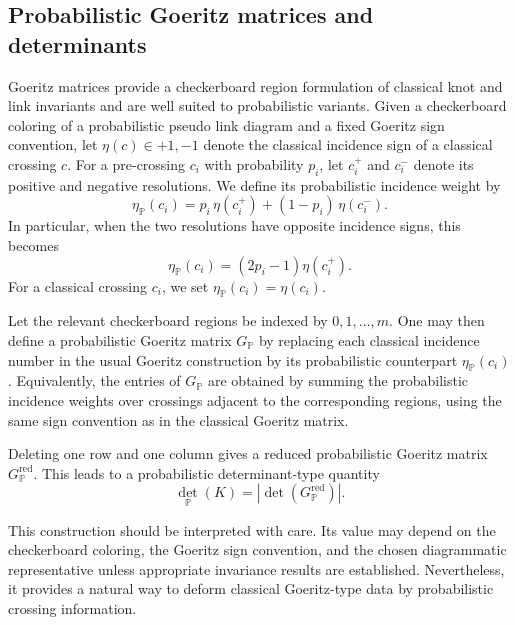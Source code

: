 \documentclass[a4paper, reqno, 12pt]{amsart}
\theoremstyle{plain}
\theoremstyle{definition}
\begin{document}
\subsection{Probabilistic Goeritz matrices and determinants}

Goeritz matrices provide a checkerboard region formulation of classical knot and link invariants and are well suited to probabilistic variants. Given a checkerboard coloring of a probabilistic pseudo link diagram and a fixed Goeritz sign convention, let \(\eta(c)\in{+1,-1}\) denote the classical incidence sign of a classical crossing \(c\). For a pre-crossing \(c_i\) with probability \(p_i\), let \(c_i^+\) and \(c_i^-\) denote its positive and negative resolutions. We define its probabilistic incidence weight by
\[
\eta_{\mathbb P}(c_i)
=
p_i\,\eta(c_i^+)+(1-p_i)\,\eta(c_i^-).
\]
In particular, when the two resolutions have opposite incidence signs, this becomes
\[
\eta_{\mathbb P}(c_i)
=
(2p_i-1)\eta(c_i^+).
\]
For a classical crossing \(c_i\), we set
\(\eta_{\mathbb P}(c_i)=\eta(c_i)\).

Let the relevant checkerboard regions be indexed by \(0,1,\ldots,m\). One may then define a probabilistic Goeritz matrix \(G_{\mathbb P}\) by replacing each classical incidence number in the usual Goeritz construction by its probabilistic counterpart \(\eta_{\mathbb P}(c_i)\). Equivalently, the entries of \(G_{\mathbb P}\) are obtained by summing the probabilistic incidence weights over crossings adjacent to the corresponding regions, using the same sign convention as in the classical Goeritz matrix.

Deleting one row and one column gives a reduced probabilistic Goeritz matrix \(G_{\mathbb P}^{\mathrm{red}}\). This leads to a probabilistic determinant-type quantity
\[
\det_{\mathbb P}(K)
=
\left|
\det\left(G_{\mathbb P}^{\mathrm{red}}\right)
\right|.
\]

This construction should be interpreted with care. Its value may depend on the checkerboard coloring, the Goeritz sign convention, and the chosen diagrammatic representative unless appropriate invariance results are established. Nevertheless, it provides a natural way to deform classical Goeritz-type data by probabilistic crossing information.
\end{document}
